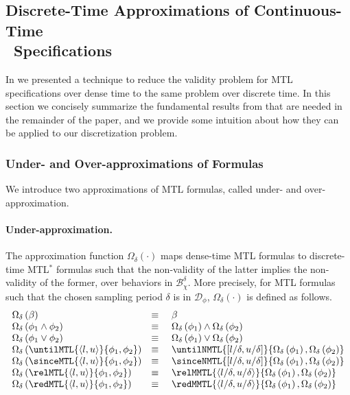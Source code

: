 \documentclass[a4paper]{article}
\newcommand{\mtlstar}{MTL$^*$}
\newcommand{\underap}[1]{\Omega_{\delta}\left({#1}\right)}
\newcommand{\Dcal}{\mathcal{D}}
\newcommand{\Bchi}{\mathcal{B}_{\chi}}
\theoremstyle{plain}
\theoremstyle{definition}
\begin{document}
\subsection{Discrete-Time Approximations of Continuous-Time \\ \ Specifications} \label{sec:discretization}
In \cite{FPR08-FM08} we presented a technique to reduce the validity problem for MTL specifications over dense time to the same problem over discrete time.
In this section we concisely summarize the fundamental results from \cite{FPR08-FM08} that are needed in the remainder of the paper, and we provide some intuition about how they can be applied to our discretization problem.


\subsubsection{Under- and Over-ap\-prox\-i\-ma\-tions of Formulas}
We introduce two approximations of MTL formulas, called under- and over-ap\-prox\-i\-ma\-tion.


\paragraph{Under-ap\-prox\-i\-ma\-tion.}
The approximation function $\underap{\cdot}$ maps dense-time MTL formulas to discrete-time \mtlstar{} formulas such that the non-validity of the latter implies the non-validity of the former, over behaviors in $\Bchi^\delta$.
More precisely, for MTL formulas such that the chosen sampling period $\delta$ is in $\Dcal_\phi$, $\underap{\cdot}$ is defined as follows.\begin{equation*}
  \begin{array}{lcl}
  \underap{\beta}  &  \equiv  & \   \beta  \\

  \underap{\phi_1 \wedge \phi_2}  &  \equiv  & \   \underap{\phi_1} \wedge \underap{\phi_2} \\

  \underap{\phi_1 \vee \phi_2}  &  \equiv  & \  \underap{\phi_1} \vee \underap{\phi_2} \\

  \underap{\untilMTL{\langle l, u \rangle}{\phi_1, \phi_2}}  &  \equiv  &
        \  \untilNMTL{[l/\delta, u/\delta ]}{\underap{\phi_1}, \underap{\phi_2}}  \\

 \underap{\sinceMTL{\langle l, u \rangle}{\phi_1, \phi_2}}  &  \equiv  &
       \  \sinceNMTL{[l/\delta, u/\delta]}{\underap{\phi_1}, \underap{\phi_2}}  \\

  \underap{\relMTL{\langle l, u \rangle}{\phi_1, \phi_2}}  &  \equiv  &
        \  \relMMTL{\langle l/\delta , u/\delta \rangle}{\underap{\phi_1}, \underap{\phi_2}} \\

 \underap{\redMTL{\langle l, u \rangle}{\phi_1, \phi_2}}  &  \equiv  &
       \  \redMMTL{\langle l/\delta , u/\delta \rangle}{\underap{\phi_1}, \underap{\phi_2}}
  \end{array}
\end{equation*}
\end{document}
